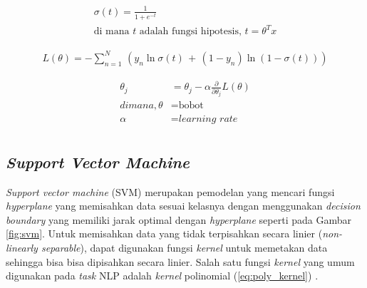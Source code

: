 \noindent \begin{align}\label{eq:logistic_function}
	\sigma(t) = {\frac {1}{1+e^{-t}}} \\[0.2cm]
	\textrm{di mana $t$ adalah fungsi hipotesis, } t = \theta^{T}x \nonumber 
\end{align}

\noindent \begin{align}\label{eq:logreg_cost_function}
	L(\theta) = - \sum_{n=1}^{N} \, (y_{n} \ln \sigma(t) \, + \, (1 - y_{n}) \ln (1 - \sigma(t)))
\end{align}

\noindent \begin{align}\label{eq:gradient_descent}
	\theta_{j} &= \theta_{j} - \alpha \frac{\partial}{\partial \theta_{j}} L(\theta) \\ \nonumber 
	di mana, \theta &= \textrm{bobot} \\ \nonumber 
			 \alpha &= \textit{learning rate} \\ \nonumber 		 
\end{align}


\subsection{\textit{Support Vector Machine}}

\textit{Support vector machine} (SVM) merupakan pemodelan yang mencari fungsi \textit{hyperplane} yang memisahkan data sesuai kelasnya dengan menggunakan \textit{decision boundary} yang memiliki jarak optimal dengan \textit{hyperplane} \citep{theodoridis2015machine} seperti pada Gambar \ref{fig:svm}. Untuk memisahkan data yang tidak terpisahkan secara linier (\textit{non-linearly separable}), dapat digunakan fungsi \textit{kernel} untuk memetakan data sehingga bisa bisa dipisahkan secara linier. Salah satu fungsi \textit{kernel} yang umum digunakan pada \textit{task} NLP adalah \textit{kernel} polinomial (\ref{eq:poly_kernel}) \citep{joachims1998text}.

